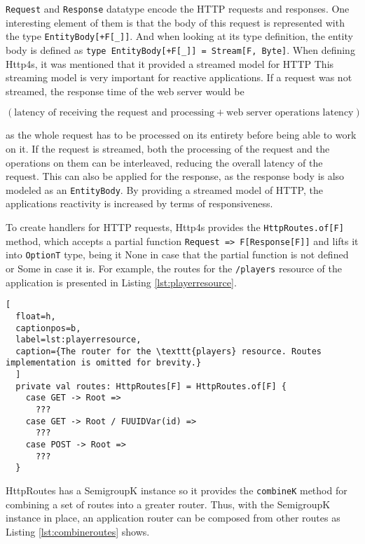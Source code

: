 \documentclass[../main.tex]{subfiles}
\begin{document}
\texttt{Request} and \texttt{Response} datatype encode the HTTP requests and
responses. One interesting element of them is that the body of this request is
represented with the type \texttt{EntityBody[+F[\_]]}. And when looking at its
type definition, the entity body is defined as
\lstinline{type EntityBody[+F[_]] = Stream[F, Byte]}.
When defining Http4s, it was mentioned that it provided a streamed model for
HTTP This streaming model is very important for reactive applications. If a
request was not streamed, the response time of the web
server would be

\begin{center}
$(\text{latency of receiving the request and processing} +
\text{web server operations latency})$
\end{center}

as the whole request has to be processed on its
entirety before being able to work on it. If the request is streamed, both
the processing of the request and the operations on them can be interleaved,
reducing the overall latency of the request. This can also be applied for the
response, as the response body is also modeled as an \texttt{EntityBody}. By
providing a streamed model of HTTP, the applications reactivity is increased by
terms of responsiveness.

To create handlers for HTTP requests, Http4s provides the \texttt{HttpRoutes.of[F]} method, which accepts a partial
function \texttt{Request => F[Response[F]]} and lifts it into \texttt{OptionT} type,
being it None in case that the partial function is not defined or Some in case
it is. For example, the routes for the \texttt{/players} resource of the
application is presented in Listing \ref{lst:playerresource}.

\begin{lstlisting}[
  float=h,
  captionpos=b,
  label=lst:playerresource,
  caption={The router for the \texttt{players} resource. Routes implementation is omitted for brevity.}
  ]
  private val routes: HttpRoutes[F] = HttpRoutes.of[F] {
    case GET -> Root =>
      ???
    case GET -> Root / FUUIDVar(id) =>
      ???
    case POST -> Root =>
      ???
  }
\end{lstlisting}

HttpRoutes has a SemigroupK instance so it provides the \texttt{combineK} method
for combining a set of routes into a greater router. Thus, with the SemigroupK
instance in place, an application router can be composed from other routes as Listing
\ref{lst:combineroutes} shows.
\end{document}
